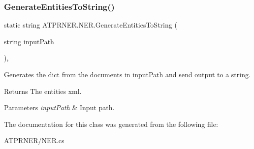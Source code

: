 \subsubsection{\texorpdfstring{Generate\+Entities\+To\+String()}{GenerateEntitiesToString()}}
{\footnotesize\ttfamily static string A\+T\+P\+R\+N\+E\+R.\+N\+E\+R.\+Generate\+Entities\+To\+String (\begin{DoxyParamCaption}\item[{string}]{input\+Path }\end{DoxyParamCaption})\hspace{0.3cm}{\ttfamily [inline]}, {\ttfamily [static]}}



Generates the dict from the documents in input\+Path and send output to a string. 

\begin{DoxyReturn}{Returns}
The entities xml.
\end{DoxyReturn}

\begin{DoxyParams}{Parameters}
{\em input\+Path} & Input path.\\
\hline
\end{DoxyParams}


The documentation for this class was generated from the following file\+:\begin{DoxyCompactItemize}
\item 
A\+T\+P\+R\+N\+E\+R/N\+E\+R.\+cs\end{DoxyCompactItemize}

